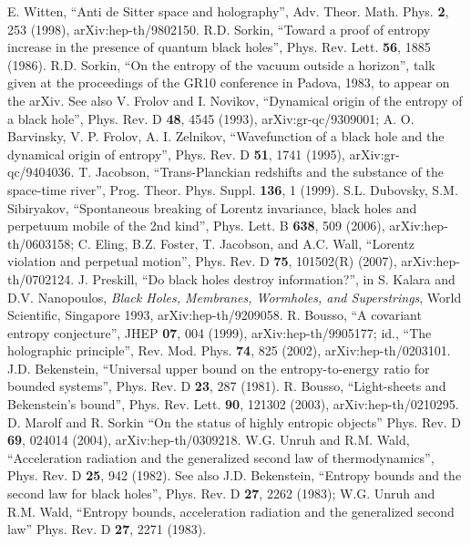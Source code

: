 \documentclass[12pt]{article}
\begin{document}
\begin{thebibliography}{99}
E. Witten, ``Anti de Sitter space and holography'', Adv. Theor. Math. Phys. \textbf{2}, 253 (1998), arXiv:hep-th/9802150.
R.D. Sorkin, ``Toward a proof of entropy increase in the presence of quantum black holes'', Phys. Rev. Lett. \textbf{56}, 1885 (1986).
R.D. Sorkin, ``On the entropy of the vacuum outside a horizon'', talk given at the proceedings of the GR10 conference in Padova, 1983, to appear on the arXiv.  See also V. Frolov and I. Novikov, ``Dynamical origin of the entropy of a black hole'', Phys. Rev. D \textbf{48}, 4545 (1993), arXiv:gr-qc/9309001; A. O. Barvinsky, V. P. Frolov, A. I. Zelnikov, ``Wavefunction of a black hole and the dynamical origin of entropy'', Phys. Rev. D \textbf{51}, 1741 (1995), 	arXiv:gr-qc/9404036.
T. Jacobson, ``Trans-Planckian redshifts and the substance of the space-time river'', Prog. Theor. Phys. Suppl. \textbf{136}, 1 (1999).
S.L. Dubovsky, S.M. Sibiryakov, ``Spontaneous breaking of Lorentz invariance, black holes and perpetuum mobile of the 2nd kind'', Phys. Lett. B \textbf{638}, 509 (2006), arXiv:hep-th/0603158; C. Eling, B.Z. Foster, T. Jacobson, and A.C. Wall, ``Lorentz violation and perpetual motion'', Phys. Rev. D \textbf{75}, 101502(R) (2007), arXiv:hep-th/0702124.
J. Preskill, ``Do black holes destroy information?'', in S. Kalara and D.V. Nanopoulos, \textit{Black Holes, Membranes, Wormholes, and Superstrings}, World Scientific, Singapore 1993, arXiv:hep-th/9209058.
R. Bousso, ``A covariant entropy conjecture'', 	JHEP \textbf{07}, 004 (1999), arXiv:hep-th/9905177; id., ``The holographic principle'', Rev. Mod. Phys. \textbf{74}, 825 (2002), arXiv:hep-th/0203101.
J.D. Bekenstein, ``Universal upper bound on the entropy-to-energy ratio for bounded systems'', Phys. Rev. D \textbf{23}, 287 (1981).
R. Bousso, ``Light-sheets and Bekenstein's bound'', Phys. Rev. Lett. \textbf{90}, 121302 (2003), arXiv:hep-th/0210295.
D. Marolf and R. Sorkin ``On the status of highly entropic objects'' Phys. Rev. D \textbf{69}, 024014 (2004), arXiv:hep-th/0309218.
W.G. Unruh and R.M. Wald, ``Acceleration radiation and the generalized second law of thermodynamics'', Phys. Rev. D \textbf{25}, 942 (1982).  See also J.D. Bekenstein, ``Entropy bounds and the second law for black holes'', Phys. Rev. D \textbf{27}, 2262 (1983); W.G. Unruh and R.M. Wald, ``Entropy bounds, acceleration radiation and the generalized second law'' Phys. Rev. D \textbf{27}, 2271 (1983).

\end{thebibliography}
\end{document}
